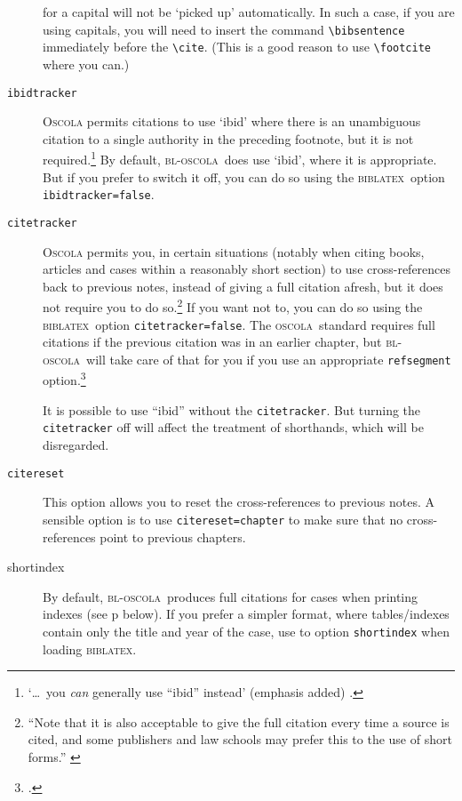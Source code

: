 \documentclass[a4paper,
               11pt,
	       DIV=1,			   
	       footinclude=false]
	      {scrartcl}
\newcommand{\oscola}{\textsc{bl-oscola}}
\newcommand{\biblatex}{\textsc{biblatex}}
\newcommand{\oscolashort}{\textsc{oscola}\nocite{oscola}}
\begin{document}
\begin{description}
  for a capital will not be `picked up' automatically. In such a case,
  if you are using capitals, you will need to insert the command
  \verb|\bibsentence| immediately before the \verb|\cite|. (This is a
  good reason to use \verb|\footcite| where you can.\label{ibidstyle})
\item[\texttt{ibidtracker}] 
   \textsc{Oscola} permits
  citations to use `ibid' where there is an unambiguous citation to a
  single authority in the preceding footnote, but it is not
  required.\footnote{`\ldots\ you \emph{can} generally use ``ibid''
    instead' (emphasis added) \cite[5]{oscola}.} By default,
  \oscola\ does use `ibid', where it is appropriate. But if you prefer
  to switch it off, you can do so using the \biblatex\ option
  \texttt{ibidtracker=false}.
\item[\texttt{citetracker}]
                  \textsc{Oscola} permits you, in certain situations (notably
  when citing books, articles and cases within a reasonably short
  section) to use cross-references back to previous notes, instead of
  giving a full citation afresh, but it does not require you to do
  so.\footnote{\enquote{Note that it is also acceptable to give the
      full citation every time a source is cited, and some publishers
      and law schools may prefer this to the use of short forms.}
    \cite[5]{oscola}} If you want not to, you can do so using the
  \biblatex\ option \texttt{citetracker={}false}. The \oscolashort\
  standard requires full citations if the previous citation was
  in an earlier chapter, but \oscola\ will take care of that for
  you if you use an appropriate \texttt{refsegment} option.\footcite[57]{biblatex2}

It is possible to use \enquote{ibid} without the
\verb|citetracker|. But turning the \verb|citetracker| off will affect
the treatment of shorthands, which will be disregarded.
\item[\texttt{citereset}] \index[general]{customization!shortened
    citations}
   This option allows you
  to reset the cross-references to previous notes. A sensible option
  is to use \texttt{citereset={}chapter} to make sure that no
  cross-references point to previous chapters.
\item[shortindex] By default, \oscola\ produces full citations for
  cases when printing indexes (see p \pageref{index:format} below). If
  you prefer a simpler format, where tables\slash indexes contain only
  the title and year of the case, use to option \texttt{shortindex}
  when loading \biblatex.
\end{description}
\end{document}
